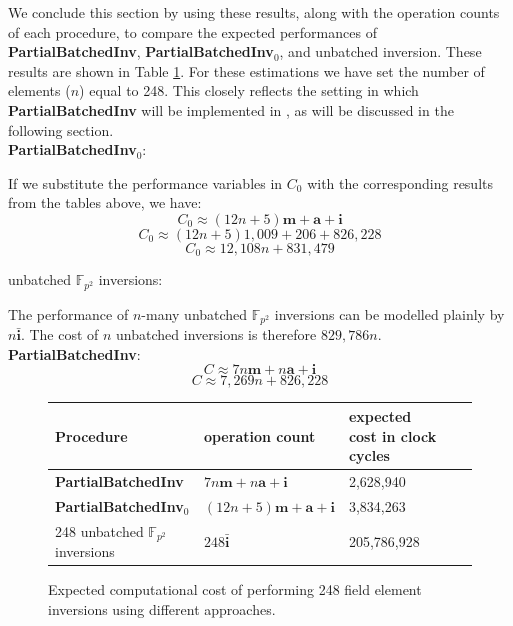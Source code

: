 We conclude this section by using these results, along with the operation counts of each procedure, to compare the expected performances of \textbf{PartialBatchedInv}, \textbf{PartialBatchedInv}$_0$, and unbatched inversion. These results are shown in Table \ref{tab:compareprocs}. For these estimations we have set the number of elements ($n$) equal to 248. This closely reflects the setting in which \textbf{PartialBatchedInv} will be implemented in \sidh, as will be discussed in the following section.\\

\noindent
\textbf{PartialBatchedInv}$_0$:

	If we substitute the performance variables in $C_0$ with the corresponding results from the tables above, we have:
$$
C_0 \approx (12n + 5)\textbf{m} + \textbf{a} + \textbf{i}
$$
$$
C_0 \approx (12n + 5)1,009 + 206 + 826,228
$$
$$
C_0 \approx 12,108n + 831,479
$$

\noindent
unbatched $\mathbb{F}_{p^2}$ inversions:

	The performance of $n$-many unbatched $\mathbb{F}_{p^2}$ inversions can be modelled plainly by $n\bar{\textbf{i}}$. The cost of $n$ unbatched inversions is therefore $829,786n$.\\

\noindent
\textbf{PartialBatchedInv}:
$$
C \approx 7n\textbf{m} + n\textbf{a} + \textbf{i}
$$
$$
C \approx 7,269n + 826,228
$$

\begin{figure}[!h]
\begin{center}
\begin{tabular}{lllll}
	\toprule
	Procedure & operation count & expected cost in clock cycles\\
	\midrule
	\textbf{PartialBatchedInv} & $7n\textbf{m} + n\textbf{a} + \textbf{i}$ & 2,628,940\\
	\textbf{PartialBatchedInv}$_0$ & $(12n + 5)\textbf{m} + \textbf{a} + \textbf{i}$ & 3,834,263\\
	248 unbatched $\mathbb{F}_{p^2}$ inversions & $248\bar{\textbf{i}}$ & 205,786,928\\
	\bottomrule
\end{tabular}
\end{center}
\caption{Expected computational cost of performing 248 field element inversions using different approaches.}
\label{tab:compareprocs}
\end{figure}

